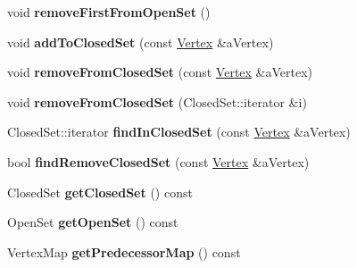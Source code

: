 \begin{DoxyCompactItemize}
\item 
void {\bfseries remove\+First\+From\+Open\+Set} ()\hypertarget{class_path_algorithm_1_1_a_star_a5bb18edbbd54833aac9eddfe63ba652d}{}\label{class_path_algorithm_1_1_a_star_a5bb18edbbd54833aac9eddfe63ba652d}

\item 
void {\bfseries add\+To\+Closed\+Set} (const \hyperlink{struct_path_algorithm_1_1_vertex}{Vertex} \&a\+Vertex)\hypertarget{class_path_algorithm_1_1_a_star_a53139e4b3cd3971a2bf85a430e83378f}{}\label{class_path_algorithm_1_1_a_star_a53139e4b3cd3971a2bf85a430e83378f}

\item 
void {\bfseries remove\+From\+Closed\+Set} (const \hyperlink{struct_path_algorithm_1_1_vertex}{Vertex} \&a\+Vertex)\hypertarget{class_path_algorithm_1_1_a_star_a1b6971a9c5878e859cbdb3270dda93b4}{}\label{class_path_algorithm_1_1_a_star_a1b6971a9c5878e859cbdb3270dda93b4}

\item 
void {\bfseries remove\+From\+Closed\+Set} (Closed\+Set\+::iterator \&i)\hypertarget{class_path_algorithm_1_1_a_star_a799953993c1255f0ce559f7233d3c926}{}\label{class_path_algorithm_1_1_a_star_a799953993c1255f0ce559f7233d3c926}

\item 
Closed\+Set\+::iterator {\bfseries find\+In\+Closed\+Set} (const \hyperlink{struct_path_algorithm_1_1_vertex}{Vertex} \&a\+Vertex)\hypertarget{class_path_algorithm_1_1_a_star_a73d9639e838fd55bb392d01238fc967a}{}\label{class_path_algorithm_1_1_a_star_a73d9639e838fd55bb392d01238fc967a}

\item 
bool {\bfseries find\+Remove\+Closed\+Set} (const \hyperlink{struct_path_algorithm_1_1_vertex}{Vertex} \&a\+Vertex)\hypertarget{class_path_algorithm_1_1_a_star_a843db81c9950c0184ee31627313f5793}{}\label{class_path_algorithm_1_1_a_star_a843db81c9950c0184ee31627313f5793}

\item 
Closed\+Set {\bfseries get\+Closed\+Set} () const \hypertarget{class_path_algorithm_1_1_a_star_a94fcc29f04e6398edbd58effbf59b49a}{}\label{class_path_algorithm_1_1_a_star_a94fcc29f04e6398edbd58effbf59b49a}

\item 
Open\+Set {\bfseries get\+Open\+Set} () const \hypertarget{class_path_algorithm_1_1_a_star_ae419f2d019378d9b4435d862b70da72f}{}\label{class_path_algorithm_1_1_a_star_ae419f2d019378d9b4435d862b70da72f}

\item 
Vertex\+Map {\bfseries get\+Predecessor\+Map} () const \hypertarget{class_path_algorithm_1_1_a_star_ac4ce233712c0f7aac44d029e61888581}{}\label{class_path_algorithm_1_1_a_star_ac4ce233712c0f7aac44d029e61888581}

\end{DoxyCompactItemize}
